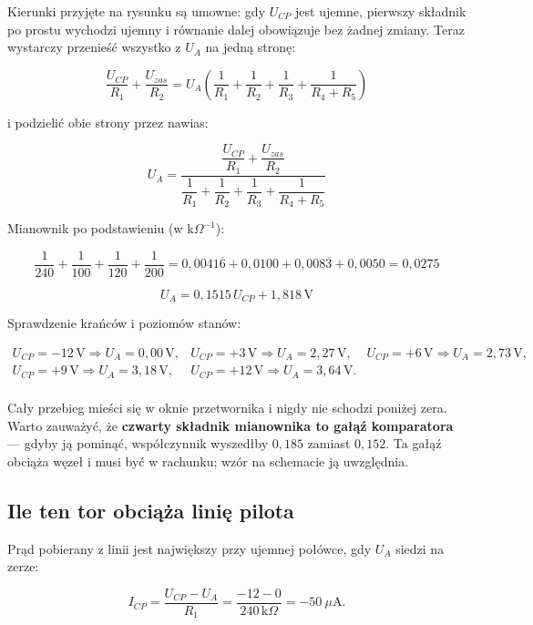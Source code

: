 \documentclass[a4paper,11pt]{article}
\newcommand{\kohm}{\,\mathrm{k}\Omega}
\newcommand{\volt}{\,\mathrm{V}}
\begin{document}
Kierunki przyjęte na rysunku są umowne: gdy $U_{CP}$ jest ujemne, pierwszy
składnik po prostu wychodzi ujemny i równanie dalej obowiązuje bez żadnej zmiany.
Teraz wystarczy przenieść wszystko z $U_A$ na jedną stronę:

\[
\frac{U_{CP}}{R_1}+\frac{U_{zas}}{R_2}
= U_A\left(\frac{1}{R_1}+\frac{1}{R_2}+\frac{1}{R_3}+\frac{1}{R_4+R_5}\right)
\]

i podzielić obie strony przez nawias:

\begin{equation}
U_A=\frac{\dfrac{U_{CP}}{R_1}+\dfrac{U_{zas}}{R_2}}
         {\dfrac{1}{R_1}+\dfrac{1}{R_2}+\dfrac{1}{R_3}+\dfrac{1}{R_4+R_5}}
\label{eq:wezelA}
\end{equation}

Mianownik po podstawieniu (w $\mathrm{k}\Omega^{-1}$):

\[
\frac{1}{240}+\frac{1}{100}+\frac{1}{120}+\frac{1}{200}
=0{,}0041\overline{6}+0{,}0100+0{,}008\overline{3}+0{,}0050=0{,}0275
\]

\begin{equation}
\boxed{\;U_A=0{,}1515\,U_{CP}+1{,}818\volt\;}
\label{eq:przelicznik}
\end{equation}

Sprawdzenie krańców i poziomów stanów:

\[
\begin{array}{llll}
U_{CP}=-12\volt \Rightarrow U_A=0{,}00\volt, &
U_{CP}=+3\volt  \Rightarrow U_A=2{,}27\volt, &
U_{CP}=+6\volt  \Rightarrow U_A=2{,}73\volt, \\[1mm]
U_{CP}=+9\volt  \Rightarrow U_A=3{,}18\volt, &
U_{CP}=+12\volt \Rightarrow U_A=3{,}64\volt. & \\
\end{array}
\]

Cały przebieg mieści się w oknie przetwornika i nigdy nie schodzi poniżej zera.
Warto zauważyć, że \textbf{czwarty składnik mianownika to gałąź komparatora} ---
gdyby ją pominąć, współczynnik wyszedłby $0{,}185$ zamiast $0{,}152$. Ta gałąź
obciąża węzeł i musi być w rachunku; wzór na schemacie ją uwzględnia.

\subsection{Ile ten tor obciąża linię pilota}

Prąd pobierany z linii jest największy przy ujemnej połówce, gdy $U_A$ siedzi
na zerze:

\[
I_{CP}=\frac{U_{CP}-U_A}{R_1}=\frac{-12-0}{240\kohm}=-50\ \mu\mathrm{A}.
\]
\end{document}
